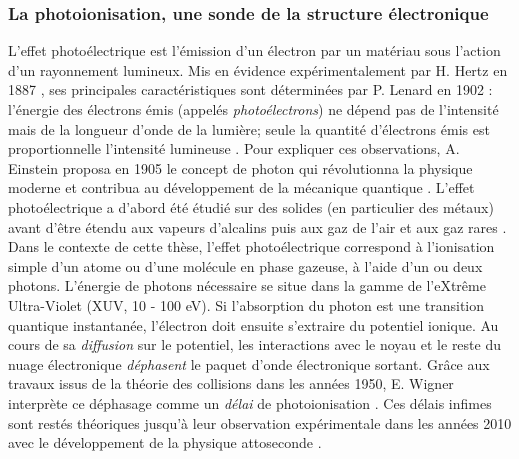 \subsubsection*{La photoionisation, une sonde de la structure électronique}
L'effet photoélectrique est l'émission d'un électron par un matériau sous l'action d'un rayonnement lumineux. Mis en évidence expérimentalement par H. Hertz en 1887 , ses principales caractéristiques sont déterminées par P. Lenard en 1902 : l'énergie des électrons émis (appelés \textit{photoélectrons}) ne dépend pas de l'intensité mais de la longueur d'onde de la lumière; seule la quantité d'électrons émis est proportionnelle l'intensité lumineuse . Pour expliquer ces observations, A. Einstein proposa en 1905 le concept de photon qui révolutionna la physique moderne et contribua au développement de la mécanique quantique . L'effet photoélectrique a d'abord été étudié sur des solides (en particulier des métaux) avant d'être étendu aux vapeurs d'alcalins puis aux gaz de l'air et aux gaz rares . Dans le contexte de cette thèse, l'effet photoélectrique correspond à l'ionisation simple d'un atome ou d'une molécule en phase gazeuse, à l'aide d'un ou deux photons. L'énergie de photons nécessaire se situe dans la gamme de l'eXtrême Ultra-Violet (XUV, 10 - 100 eV). Si l'absorption du photon est une transition quantique instantanée, l'électron doit ensuite s'extraire du potentiel ionique. Au cours de sa \textit{diffusion} sur le potentiel, les interactions avec le noyau et le reste du nuage électronique \textit{déphasent} le paquet d'onde électronique sortant. Grâce aux travaux issus de la théorie des collisions dans les années 1950, E. Wigner interprète ce déphasage comme un \textit{délai} de photoionisation . Ces délais infimes sont restés théoriques jusqu'à leur observation expérimentale dans les années 2010 avec le développement de la physique attoseconde . 


